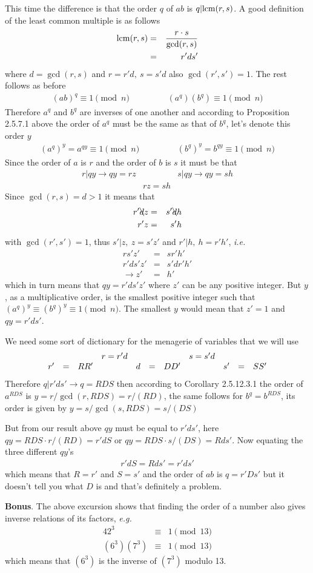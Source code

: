 \documentclass[aps,preprint,preprintnumbers,nofootinbib,showpacs,prd]{revtex4-1}
\newcommand{\ie}{{\it i.e.} }
\newcommand{\eg}{{\it e.g.} }
\newcommand{\ba}{\begin{array}}
\newcommand{\ea}{\end{array}}
\newcommand{\nbea}{\begin{eqnarray*}}
\newcommand{\neea}{\end{eqnarray*}}
\begin{document}
This time the difference is that the order $q$ of $ab$ is $q |{\rm lcm}(r,s)$. A good definition of the least common multiple is as follows
%
\nbea
{\rm lcm}(r,s) & = & \frac{r \cdot s}{\gcd(r,s)} \\
& = & r' d s'
\neea
%
where $d = \gcd(r,s)$ and $r = r'd, ~ s = s'd$ also $\gcd(r',s') = 1$. The rest follows as before
%
\nbea
(ab)^q \equiv 1 \pmod{n} & ~~~~~~~~~~~~~ & (a^q)(b^q) \equiv 1 \pmod{n}
\neea
%
Therefore $a^q$ and $b^q$ are inverses of one another and according to Proposition 2.5.7.1 above the order of $a^q$ must be the same as that of $b^q$, let's denote this order $y$
%
\nbea
(a^q)^y  = a^{qy} \equiv 1 \pmod{n} & ~~~~~~~~~~~~~ & (b^q)^y  = b^{qy} \equiv 1 \pmod{n}
\neea
%
Since the order of $a$ is $r$ and the order of $b$ is $s$ it must be that
%
\nbea
r | qy \to qy = rz & & s | qy \to qy = sh \\
& rz = sh &
\neea
%
Since $\gcd(r,s) = d > 1$ it means that 
%
\nbea
r' \bcancel{d} z & = & s' \bcancel{d} h \\
r' z & = & s' h
\neea
%
with $\gcd(r',s') = 1$, thus $s'|z, ~z = s'z'$ and $r'|h, ~h = r'h'$, \ie
%
\nbea
rs'z' & = & sr'h' \\
r'ds'z' & = & s'dr'h' \\
\to z' & = & h'
\neea
%
which in turn means that $qy = r'ds' z'$ where $z'$ can be any positive integer. But $y$, as a multiplicative order, is the smallest positive integer such that $(a^q)^y \equiv (b^q)^y \equiv 1 \pmod{n}$. The smallest $y$ would mean that $z' = 1$ and $qy = r' d s'$.


We need some sort of dictionary for the menagerie of variables that we will use
%
\nbea
\ba{r c l c r c l c r c l}
&&& r = r' d &&&& s = s' d \\
r' & = & R R' & ~~~ & d & = & D D' & ~~~ & s' & = & S S'
\ea
\neea
%
Therefore $q|r'ds' \to q = R D S$ then according to Corollary 2.5.12.3.1 the order of $a^{R D S}$ is $y = r/\gcd(r,R D S) = r/(R D)$, the same follows for $b^q = b^{R D S}$, its order is given by $y = s/\gcd(s,R D S) = s/(D S)$

But from our result above $qy$ must be equal to $r' d s'$, here $qy = R D S \cdot r/(R D) = r' d S$ or $qy =R D S \cdot s/(D S) = R d s'$. Now equating the three different $qy$'s
%
\nbea
r' d S = R d s' = r' d s'
\neea
%
which means that $R = r'$ and $S = s'$ and the order of $ab$ is $q = r' D s'$ but it doesn't tell you what $D$ is and that's definitely a problem.

{\bf Bonus}. The above excursion shows that finding the order of a number also gives inverse relations of its factors, \eg
%
\nbea
42^3 & \equiv & 1 \pmod{13} \\
(6^3) (7^3) & \equiv & 1 \pmod{13}
\neea
%
which means that $(6^3)$ is the inverse of $(7^3)$ modulo 13.
\end{document}
